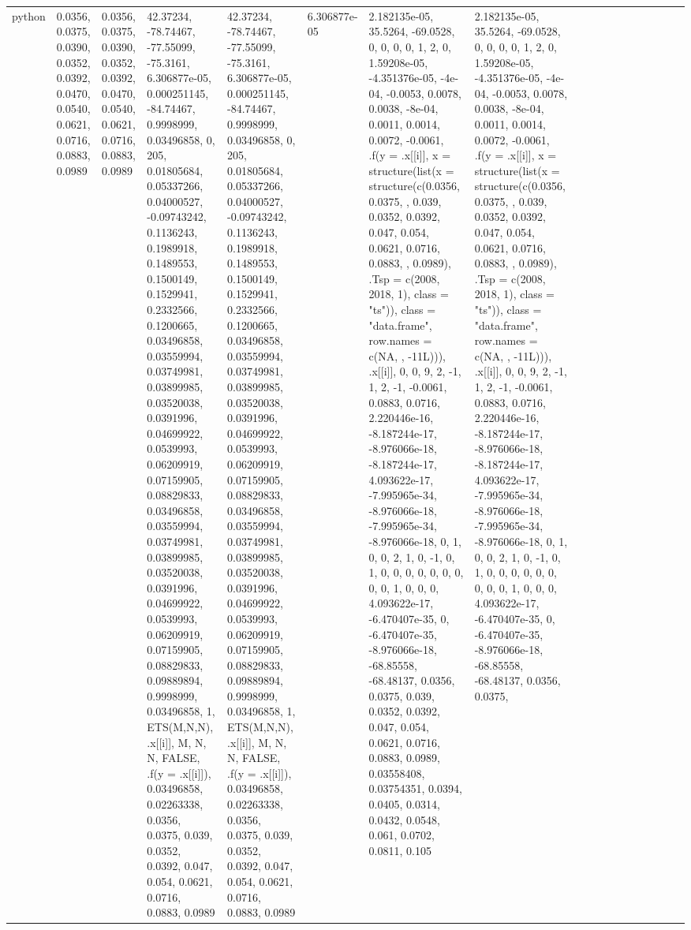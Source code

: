 \documentclass[
]{article}
\begin{document}
\begin{table}
\begin{tabular}{l|l|l|l|l|l|l|l|l|l|l|r|l|r|r|r|r|r}
python & 0.0356, 0.0375, 0.0390, 0.0352, 0.0392, 0.0470, 0.0540, 0.0621, 0.0716, 0.0883, 0.0989 & 0.0356, 0.0375, 0.0390, 0.0352, 0.0392, 0.0470, 0.0540, 0.0621, 0.0716, 0.0883, 0.0989 & 42.37234, -78.74467, -77.55099, -75.3161, 6.306877e-05, 0.000251145, -84.74467, 0.9998999, 0.03496858, 0, 205, 0.01805684, 0.05337266, 0.04000527, -0.09743242, 0.1136243, 0.1989918, 0.1489553, 0.1500149, 0.1529941, 0.2332566, 0.1200665, 0.03496858, 0.03559994, 0.03749981, 0.03899985, 0.03520038, 0.0391996, 0.04699922, 0.0539993, 0.06209919, 0.07159905, 0.08829833, 0.03496858, 0.03559994, 0.03749981, 0.03899985, 0.03520038, 0.0391996, 0.04699922, 0.0539993, 0.06209919, 0.07159905, 0.08829833, 0.09889894, 0.9998999, 0.03496858, 1, ETS(M,N,N), .x[[i]], M, N, N, FALSE, .f(y = .x[[i]]), 0.03496858, 0.02263338, 0.0356, 0.0375, 0.039, 0.0352, 0.0392, 0.047, 0.054, 0.0621, 0.0716, 0.0883, 0.0989 & 42.37234, -78.74467, -77.55099, -75.3161, 6.306877e-05, 0.000251145, -84.74467, 0.9998999, 0.03496858, 0, 205, 0.01805684, 0.05337266, 0.04000527, -0.09743242, 0.1136243, 0.1989918, 0.1489553, 0.1500149, 0.1529941, 0.2332566, 0.1200665, 0.03496858, 0.03559994, 0.03749981, 0.03899985, 0.03520038, 0.0391996, 0.04699922, 0.0539993, 0.06209919, 0.07159905, 0.08829833, 0.03496858, 0.03559994, 0.03749981, 0.03899985, 0.03520038, 0.0391996, 0.04699922, 0.0539993, 0.06209919, 0.07159905, 0.08829833, 0.09889894, 0.9998999, 0.03496858, 1, ETS(M,N,N), .x[[i]], M, N, N, FALSE, .f(y = .x[[i]]), 0.03496858, 0.02263338, 0.0356, 0.0375, 0.039, 0.0352, 0.0392, 0.047, 0.054, 0.0621, 0.0716, 0.0883, 0.0989 & 6.306877e-05 & 2.182135e-05, 35.5264, -69.0528, 0, 0, 0, 0, 1, 2, 0, 1.59208e-05, -4.351376e-05, -4e-04, -0.0053, 0.0078, 0.0038, -8e-04, 0.0011, 0.0014, 0.0072, -0.0061, .f(y = .x[[i]], x = structure(list(x = structure(c(0.0356, 0.0375, , 0.039, 0.0352, 0.0392, 0.047, 0.054, 0.0621, 0.0716, 0.0883, , 0.0989), .Tsp = c(2008, 2018, 1), class = "ts")), class = "data.frame", row.names = c(NA, , -11L))), .x[[i]], 0, 0, 9, 2, -1, 1, 2, -1, -0.0061, 0.0883, 0.0716, 2.220446e-16, -8.187244e-17, -8.976066e-18, -8.187244e-17, 4.093622e-17, -7.995965e-34, -8.976066e-18, -7.995965e-34, -8.976066e-18, 0, 1, 0, 0, 2, 1, 0, -1, 0, 1, 0, 0, 0, 0, 0, 0, 0, 0, 0, 1, 0, 0, 0, 4.093622e-17, -6.470407e-35, 0, -6.470407e-35, -8.976066e-18, -68.85558, -68.48137, 0.0356, 0.0375, 0.039, 0.0352, 0.0392, 0.047, 0.054, 0.0621, 0.0716, 0.0883, 0.0989, 0.03558408, 0.03754351, 0.0394, 0.0405, 0.0314, 0.0432, 0.0548, 0.061, 0.0702, 0.0811, 0.105 & 2.182135e-05, 35.5264, -69.0528, 0, 0, 0, 0, 1, 2, 0, 1.59208e-05, -4.351376e-05, -4e-04, -0.0053, 0.0078, 0.0038, -8e-04, 0.0011, 0.0014, 0.0072, -0.0061, .f(y = .x[[i]], x = structure(list(x = structure(c(0.0356, 0.0375, , 0.039, 0.0352, 0.0392, 0.047, 0.054, 0.0621, 0.0716, 0.0883, , 0.0989), .Tsp = c(2008, 2018, 1), class = "ts")), class = "data.frame", row.names = c(NA, , -11L))), .x[[i]], 0, 0, 9, 2, -1, 1, 2, -1, -0.0061, 0.0883, 0.0716, 2.220446e-16, -8.187244e-17, -8.976066e-18, -8.187244e-17, 4.093622e-17, -7.995965e-34, -8.976066e-18, -7.995965e-34, -8.976066e-18, 0, 1, 0, 0, 2, 1, 0, -1, 0, 1, 0, 0, 0, 0, 0, 0, 0, 0, 0, 1, 0, 0, 0, 4.093622e-17, -6.470407e-35, 0, -6.470407e-35, -8.976066e-18, -68.85558, -68.48137, 0.0356, 0.0375, 
\end{tabular}
\end{table}
\end{document}
